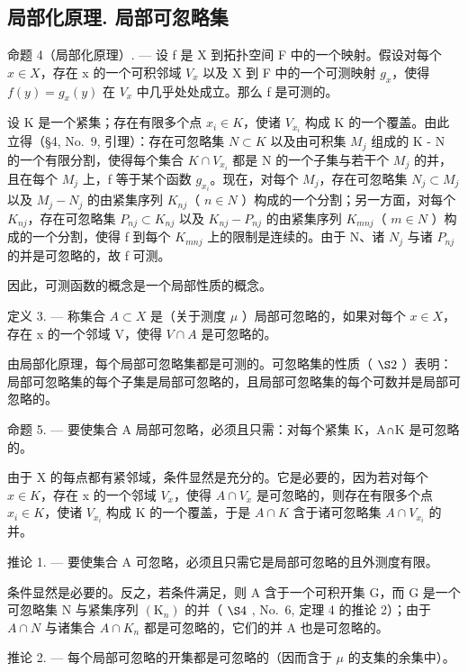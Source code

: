 \subsection{局部化原理. 局部可忽略集}

命题 4（局部化原理）. --- 设 f 是 X 到拓扑空间 F 中的一个映射。假设对每个 \(x \in X\)，存在 x 的一个可积邻域 \(V_{x}\) 以及 X 到 F 中的一个可测映射 \(g_{x}\)，使得 \(f(y) = g_{x}(y)\) 在 \(V_{x}\) 中几乎处处成立。那么 f 是可测的。

设 K 是一个紧集；存在有限多个点 \(x_{i} \in K\)，使诸 \(V_{x_{i}}\) 构成 K 的一个覆盖。由此立得（§4, No.~9, 引理）：存在可忽略集 \(N \subset K\) 以及由可积集 \(M_{j}\) 组成的 K - N 的一个有限分割，使得每个集合 \(K \cap V_{x_{i}}\) 都是 N 的一个子集与若干个 \(M_{j}\) 的并，且在每个 \(M_{j}\) 上，f 等于某个函数 \(g_{x_{i}}\)。现在，对每个 \(M_{j}\)，存在可忽略集 \(N_{j} \subset M_{j}\) 以及 \(M_{j} - N_{j}\) 的由紧集序列 \(K_{nj}\)（ \(n \in N\) ）构成的一个分割；另一方面，对每个 \(K_{nj}\)，存在可忽略集 \(P_{nj} \subset K_{nj}\) 以及 \(K_{nj} - P_{nj}\) 的由紧集序列 \(K_{mnj}\)（ \(m \in N\) ）构成的一个分割，使得 f 到每个 \(K_{mnj}\) 上的限制是连续的。由于 N、诸 \(N_{j}\) 与诸 \(P_{nj}\) 的并是可忽略的，故 f 可测。

因此，可测函数的概念是一个局部性质的概念。

定义 3. --- 称集合 \(A \subset X\) 是（关于测度 \(\mu\) ）局部可忽略的，如果对每个 \(x \in X\)，存在 x 的一个邻域 V，使得 \(V \cap A\) 是可忽略的。

由局部化原理，每个局部可忽略集都是可测的。可忽略集的性质（ \(\S2\) ）表明：局部可忽略集的每个子集是局部可忽略的，且局部可忽略集的每个可数并是局部可忽略的。

命题 5. --- 要使集合 A 局部可忽略，必须且只需：对每个紧集 K，A∩K 是可忽略的。

由于 X 的每点都有紧邻域，条件显然是充分的。它是必要的，因为若对每个 \(x \in K\)，存在 x 的一个邻域 \(V_{x}\)，使得 \(A \cap V_{x}\) 是可忽略的，则存在有限多个点 \(x_{i} \in K\)，使诸 \(V_{x_{i}}\) 构成 K 的一个覆盖，于是 \(A \cap K\) 含于诸可忽略集 \(A \cap V_{x_{i}}\) 的并。

推论 1. --- 要使集合 A 可忽略，必须且只需它是局部可忽略的且外测度有限。

条件显然是必要的。反之，若条件满足，则 A 含于一个可积开集 G，而 G 是一个可忽略集 N 与紧集序列 \((\mathrm{K}_{n})\) 的并（ \(\S4\) , No.~6, 定理 4 的推论 2）；由于 \(A \cap N\) 与诸集合 \(A \cap K_{n}\) 都是可忽略的，它们的并 A 也是可忽略的。

推论 2. --- 每个局部可忽略的开集都是可忽略的（因而含于 \(\mu\) 的支集的余集中）。

